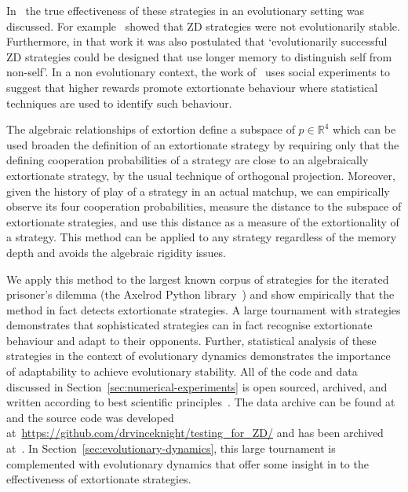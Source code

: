 \documentclass[a4paper]{article}
\begin{document}
In~\cite{adami2013evolutionary, Hilbe2013, hilbe2013adaptive, hilbe2015partners,
ichinose2018zero, Moran1707} the true effectiveness of these strategies in an
evolutionary setting was discussed. For example~\cite{adami2013evolutionary}
showed that ZD strategies were not evolutionarily stable. Furthermore, in that
work it was also postulated that `evolutionarily successful ZD strategies could
be designed that use longer memory to distinguish self from non-self'. In a non
evolutionary context, the work of~\cite{becks2019extortion} uses social
experiments to suggest that higher rewards promote extortionate
behaviour where statistical techniques are used to identify such behaviour.

The algebraic relationships of extortion define a subspace of
\(p\in\mathbb{R}^4\) which can be used broaden the definition of an extortionate
strategy by requiring only that the defining cooperation probabilities of a
strategy are close to an algebraically extortionate strategy, by the usual
technique of orthogonal projection. Moreover, given the history of play of a
strategy in an actual matchup, we can empirically observe its four
cooperation probabilities, measure the distance to the subspace of extortionate
strategies, and use this distance as a measure of the extortionality of a
strategy. This method can be applied to any strategy regardless of the memory
depth and avoids the algebraic rigidity issues.

We apply this method to the largest known corpus of strategies for the iterated
prisoner's dilemma (the Axelrod Python library~\cite{Knight2016, Knight2018})
and show empirically that the method in fact detects extortionate strategies.
A large tournament with 
strategies demonstrates that sophisticated
strategies can in fact recognise extortionate behaviour and adapt to their
opponents. Further, statistical analysis of these strategies in the context of
evolutionary dynamics demonstrates the importance of adaptability to achieve
evolutionary stability. All of the code and data discussed in
Section~\ref{sec:numerical-experiments} is open sourced, archived, and written
according to best scientific principles~\cite{Wilson2014}. The data archive can
be found at~\cite{vincent_knight_2018_1297075} and the source code was developed
at~\url{https://github.com/drvinceknight/testing_for_ZD/} and has been archived
at~\cite{vincent_knight_2019_2598534}. In
Section~\ref{sec:evolutionary-dynamics}, this large tournament is complemented
with evolutionary dynamics that offer some insight in to the
effectiveness of extortionate strategies.
\end{document}
